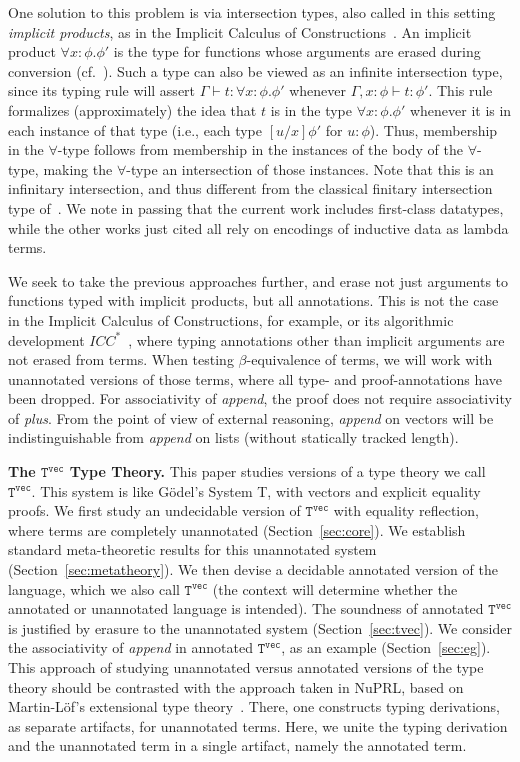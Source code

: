 \documentclass[copyright]{eptcs}
\newcommand{\vc}[0]{\texttt{vec}}
\newcommand{\Tvec}[0]{\texttt{T}^\vc}
\begin{document}
One solution to this problem is via intersection types, also called in
this setting \emph{implicit products}, as in the Implicit Calculus of
Constructions~\cite{miquel01}.  An implicit product $\forall
x:\phi.\phi'$ is the type for functions whose arguments are erased
during conversion (cf.~\cite{mishra-linger+08,barras+08}).  Such a
type can also be viewed as an infinite intersection type, since its
typing rule will assert $\Gamma \vdash t : \forall x:\phi.\phi'$
whenever $\Gamma, x :\phi\vdash t:\phi'$.  This rule formalizes
(approximately) the idea that $t$ is in the type $\forall
x:\phi.\phi'$ whenever it is in each instance of that type (i.e., each
type $[u/x]\phi'$ for $u:\phi$).  Thus, membership in the
$\forall$-type follows from membership in the instances of the body of
the $\forall$-type, making the $\forall$-type an intersection of those
instances.  Note that this is an infinitary intersection, and thus
different from the classical finitary intersection type
of~\cite{CoppoDezani78}.  We note in passing that the current work includes
first-class datatypes, while the other works just cited all rely on
encodings of inductive data as lambda terms.

We seek to take the previous approaches further, and erase not just
arguments to functions typed with implicit products, but all
annotations.  This is not the case in the Implicit Calculus of
Constructions, for example, or its algorithmic development
$\textit{ICC}^*$~\cite{barras+08}, where typing annotations other than
implicit arguments are not erased from terms.  When testing
$\beta$-equivalence of terms, we will work with unannotated versions
of those terms, where all type- and proof-annotations have been
dropped.  For associativity of \textit{append}, the proof does not
require associativity of \textit{plus}.  From the point of view of
external reasoning, \textit{append} on vectors will be
indistinguishable from \textit{append} on lists (without statically
tracked length).  

\textbf{The $\Tvec$ Type Theory.} This paper studies versions of a
type theory we call $\Tvec$.  This system is like G\"odel's System T,
with vectors and explicit equality proofs.  We first study an
undecidable version of $\Tvec$ with equality reflection, where terms
are completely unannotated (Section~\ref{sec:core}).  We establish
standard meta-theoretic results for this unannotated system
(Section~\ref{sec:metatheory}).  We then devise a decidable annotated
version of the language, which we also call $\Tvec$ (the context will
determine whether the annotated or unannotated language is intended).
The soundness of annotated $\Tvec$ is justified by erasure to the
unannotated system (Section~\ref{sec:tvec}).  We consider the
associativity of \textit{append} in annotated $\Tvec$, as an example
(Section~\ref{sec:eg}).  This approach of studying unannotated versus
annotated versions of the type theory should be contrasted with the
approach taken in NuPRL, based on Martin-L\"of's extensional type
theory~\cite{C86,ml84}.  There, one constructs typing derivations, as
separate artifacts, for unannotated terms.  Here, we unite the typing
derivation and the unannotated term in a single artifact, namely the
annotated term.
\end{document}
